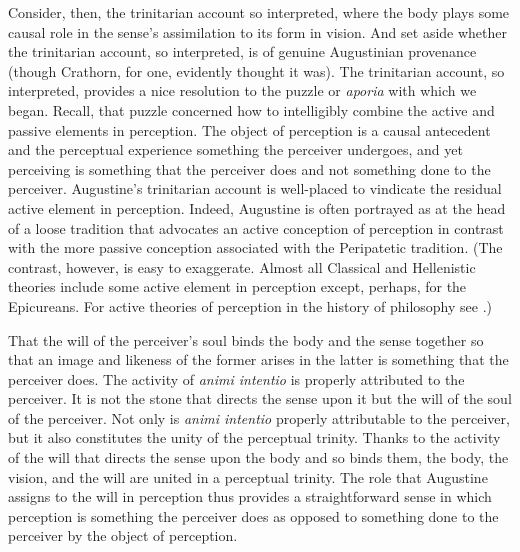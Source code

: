 \documentclass[12pt]{article}
\begin{document}
Consider, then, the trinitarian account so interpreted, where the body plays some causal role in the sense's assimilation to its form in vision. And set aside whether the trinitarian account, so interpreted, is of genuine Augustinian provenance (though Crathorn, for one, evidently thought it was). The trinitarian account, so interpreted, provides a nice resolution to the puzzle or \emph{aporia} with which we began. Recall, that puzzle concerned how to intelligibly combine the active and passive elements in perception. The object of perception is a causal antecedent and the perceptual experience something the perceiver undergoes, and yet perceiving is something that the perceiver does and not something done to the perceiver. Augustine's trinitarian account is well-placed to vindicate the residual active element in perception. Indeed, Augustine is often portrayed as at the head of a loose tradition that advocates an active conception of perception in contrast with the more passive conception associated with the Peripatetic tradition. (The contrast, however, is easy to exaggerate. Almost all Classical and Hellenistic theories include some active element in perception except, perhaps, for the Epicureans. For active theories of perception in the history of philosophy see \citealt{Silva:2014cl}.)

That the will of the perceiver's soul binds the body and the sense together so that an image and likeness of the former arises in the latter is something that the perceiver does. The activity of \emph{animi intentio} is properly attributed to the perceiver. It is not the stone that directs the sense upon it but the will of the soul of the perceiver. Not only is \emph{animi intentio} properly attributable to the perceiver, but it also constitutes the unity of the perceptual trinity. Thanks to the activity of the will that directs the sense upon the body and so binds them, the body, the vision, and the will are united in a perceptual trinity. The role that Augustine assigns to the will in perception thus provides a straightforward sense in which perception is something the perceiver does as opposed to something done to the perceiver by the object of perception. 
\end{document}
